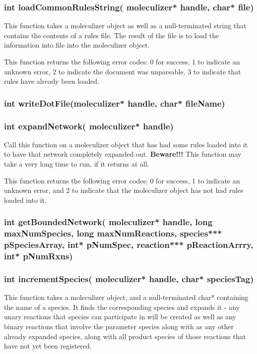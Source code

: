 \subsubsection{int loadCommonRulesString( moleculizer* handle, char* file)}
This function takes a moleculizer object as well as a null-terminated
string that contains the contents of a rules file.  The result of the
file is to load the information into file into the moleculizer object.

This function returns the following error codes: 0 for success, 1 to
indicate an unknown error, 2 to indicate the document was unparsable,
3 to indicate that rules have already been loaded.

\subsubsection{int writeDotFile(moleculizer* handle, char* fileName)}

\subsubsection{int expandNetwork( moleculizer* handle)}
Call this function on a moleculizer object that has had some rules
loaded into it to have that network completely expanded out.
\textbf{Beware!!!}  This function may take a very long time to run, if
  it returns at all.  

This function returns the following error codes: 0 for success, 1 to
indicate an unknown error, and 2 to indicate that the moleculizer
object has not had rules loaded into it.  

\subsubsection{int getBoundedNetwork( moleculizer* handle, long maxNumSpecies, long maxNumReactions, species*** pSpeciesArray, int* pNumSpec, reaction*** pReactionArrry, int* pNumRxns)}

\subsubsection{int incrementSpecies( moleculizer* handle, char*
  speciesTag)}

This function takes a moleculizer object, and a null-terminated char*
containing the name of a species.  It finds the corresponding species
and expands it - any unary reactions that species can participate in
will be created as well as any binary reactions that involve the
parameter species along with as any other already expanded species, along
with all product species of those reactions that have not yet been
registered.

